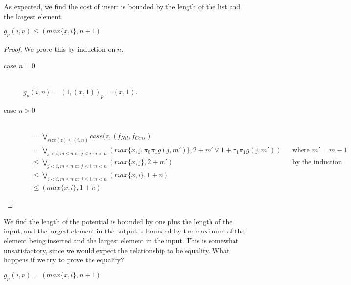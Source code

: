 %
As expected, we find the cost of insert is bounded by the length of the list and the largest element.
%
\begin{lemma}
  \label{lem:insert_rec_potential}
  $g_p(i,n) \leq (max\{x, i\}, n+1)$
\end{lemma}
%
\begin{proof}
  We prove this by induction on $n$.
  \begin{description}
    \item[case $n=0$]\hfill \\
      $g_p(i,n) = (1, (x, 1))_p = (x, 1)$.
    \item[case $n>0$]\hfill \\
      \begin{align*}
        &= \bigvee_{size(z) \leq (i,n)} case(z, (f_{Nil}, f_{Cons}) &&\\
        &= \bigvee_{j < i, m \leq n \text{ or } j \leq i, m < n} (max\{x, j, \pi_0\pi_1g(j, m')\}, 2 + m' \vee 1 + \pi_1\pi_1g(j, m')) && \text{where $m' = m - 1$}\\
        &\leq \bigvee_{j < i, m \leq n \text{ or } j \leq i, m < n} (max\{x, j\}, 2 + m')&&\text{by the induction hypothesis}\\
        &\leq \bigvee_{j < i, m \leq n \text{ or } j \leq i, m < n} (max\{x,i\}, 1 + n)&&\\
        &\leq (max\{x,i\}, 1 + n)&&
      \end{align*}
  \end{description}
\end{proof}
%
We find the length of the potential is bounded by one plus the length of the
input, and the largest element in the output is bounded by the maximum of the
element being inserted and the largest element in the input.  This is somewhat
unsatisfactory, since we would expect the relationship to be equality.  What
happens if we try to prove the equality?
%
\begin{lemma}
  \label{lem:insert_rec_potential_wrong}
  $g_p(i,n) = (max\{x, i\}, n+1)$
\end{lemma}
